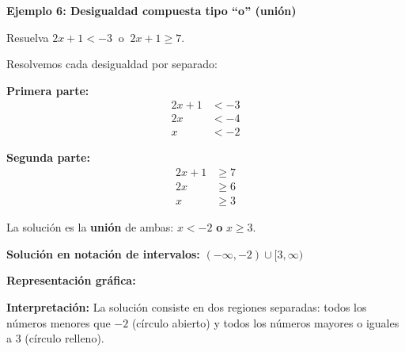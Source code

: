 \begin{example}
\textbf{Ejemplo 6: Desigualdad compuesta tipo ``o'' (unión)}

Resuelva $2x + 1 < -3 \;\;\text{o}\;\; 2x + 1 \ge 7$.

\solution

Resolvemos cada desigualdad por separado:

\textbf{Primera parte:}
\begin{align*}
2x + 1 &< -3 \\
2x &< -4 \\
x &< -2
\end{align*}

\textbf{Segunda parte:}
\begin{align*}
2x + 1 &\ge 7 \\
2x &\ge 6 \\
x &\ge 3
\end{align*}

La solución es la \textbf{unión} de ambas: $x < -2$ \textbf{o} $x \ge 3$.

\textbf{Solución en notación de intervalos:} $(-\infty, -2) \cup [3, \infty)$

\textbf{Representación gráfica:}

\begin{center}
\end{center}

\textbf{Interpretación:} La solución consiste en dos regiones separadas: todos los números menores que $-2$ (círculo abierto) y todos los números mayores o iguales a 3 (círculo relleno).
\end{example}

\newpage


